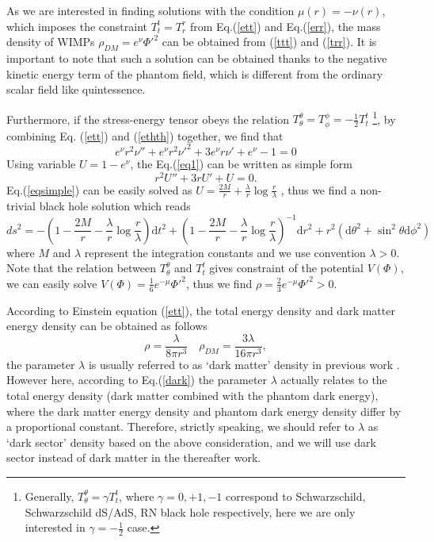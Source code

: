 \documentclass[a4paper,11pt]{article}
\begin{document}
As we are interested in finding solutions with the condition $\mu(r)=-\nu(r)$, which imposes the constraint $T^t_t=T^r_r$ from Eq.(\ref{ett}) and Eq.(\ref{err}), the mass density of WIMPs $\rho_{DM}=e^{\nu}\Phi'^2$ can be obtained from (\ref{ttt}) and (\ref{trr}). It is important to note that such a solution can be obtained thanks to the negative kinetic energy term of the phantom field, which is different from the ordinary scalar field like quintessence.

Furthermore, if the stress-energy tensor obeys the relation $T^{\theta}_{\theta}=T^{\phi}_{\phi}=-\frac{1}{2}T^{t}_{t}$ \footnote{Generally, $T^{\theta}_{\theta}=\gamma T^{t}_{t}$, where $\gamma=0,+1,-1$ correspond to Schwarzschild, Schwarzschild dS/AdS, RN black hole respectively, here we are only interested in $\gamma=-\frac{1}{2}$ case.}, by combining Eq. (\ref{ett}) and (\ref{ethth}) together,  we find that 
\begin{equation}\label{eq1}  e^{\nu}r^{2}\nu''+e^{\nu}r^{2}\nu'^{2}+3e^{\nu}r \nu'+e^{\nu}-1=0
\end{equation}
Using variable $U=1-e^{\nu}$, the Eq.(\ref{eq1}) can be written as simple form 
\begin{equation} \label{eqsimple}
    r^{2}U''+3rU'+U=0.
\end{equation}
Eq.(\ref{eqsimple}) can be easily solved as $U=\frac{2M}{r}+\frac{\lambda}{r} \log \frac{r}{\lambda}$ , thus we find a non-trivial black hole solution which reads~\cite{Li:2012zx}
\begin{equation} \label{metr}
       ds^{2}=-(1-\frac{2M}{r}-\frac{\lambda}{r} \log \frac{r}{\lambda})\mathrm{d}t^{2}+(1-\frac{2M}{r}-\frac{\lambda}{r} \log \frac{r}{\lambda})^{-1}\mathrm{d}r^{2}+r^{2}(\mathrm{d}\theta^{2}+\sin^{2}\theta \mathrm{d}\phi^{2})
\end{equation}
where $M$ and $\lambda$ represent the integration constants and we use convention $\lambda>0$. Note that the relation between $T^{\theta}_{\theta}$ and $T^{t}_{t}$ gives constraint of the potential $V(\Phi)$, we can easily solve $V(\Phi)=\frac{1}{6}e^{-\mu}\Phi'^{2}$, thus we find $\rho=\frac{2}{3}e^{-\mu}\Phi'^{2}>0$.

According to Einstein equation (\ref{ett}), the total energy density and dark matter energy density can be obtained as follows
\begin{equation}\label{dark}
   \rho =\frac{\lambda}{8\pi r^{3}}\quad \rho_{DM}=\frac{3 \lambda}{16 \pi r^{3}},
\end{equation}
the parameter $\lambda$ is usually referred to as `dark matter' density in previous work \cite{Hendi:2020zyw,Xu:2016ylr,Cao:2021dcq}. However here, according to Eq.(\ref{dark}) the parameter $\lambda$ actually relates to the total energy density (dark matter combined with the phantom dark energy), where the dark matter energy density and phantom dark energy density differ by a proportional constant. Therefore, strictly speaking, we should refer to $\lambda$ as `dark sector' density based on the above consideration, and we will use dark sector instead of dark matter in the thereafter work.
\end{document}
